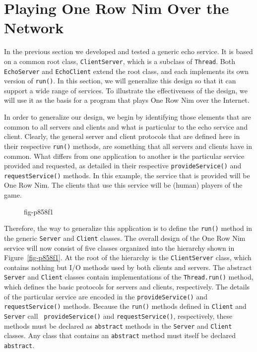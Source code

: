 \section{Playing One Row Nim Over the Network}

\noindent In the previous section we developed and tested a generic echo service.  
It is based on a common root class, {\tt ClientServer}, which is a subclass of
{\tt Thread}.  Both {\tt EchoServer} and {\tt EchoClient} extend the
root class, and each implements its own version of {\tt run()}. In
this section, we will generalize this design so that it can support a wide
range of services.  To illustrate the effectiveness of the design, we
will use it as the basis for a program that plays One Row Nim over the
Internet.

In order to generalize our design, we begin by identifying
those elements that are common to all
servers and clients and what is particular to the echo service and
client.  Clearly, the general server and client protocols that are defined
here in their respective {\tt run()} methods, are something that all
servers and clients have in common.  What differs from one application
to another is the particular service provided and requested, as
detailed in their respective {\tt provideService()} and {\tt
requestService()} methods. In this example, the service that is
provided will be One Row Nim.  The clients that use this service will
be (human) players of the game.

\begin{figure}[bt]
{fig-p858f1}
\end{figure}

Therefore, the way to generalize this application is to define the
{\tt run()} method in the generic {\tt Server} and {\tt Client}
classes. The overall design of the One Row Nim service will now consist of five classes
organized into the hierarchy shown in Figure~\ref{fig-p858f1}.  At
the root of the hierarchy is the {\tt ClientServer} class, which
contains nothing but I/O methods used by both clients and servers.
The abstract {\tt Server} and {\tt Client} classes contain
implementations of the {\tt Thread.run()} method, which defines the
basic protocols for servers and clients, respectively.   The details of the
particular service are encoded in the {\tt provideService()} and
{\tt requestService()} methods. Because the {\tt run()} methods defined 
in {\tt Client} and {\tt Server} call {\tt
provideService()} and {\tt requestService()}, respectively,  these
methods must be declared as {\tt abstract} methods in the {\tt Server}
and {\tt Client} classes.  Any class that contains an
\mbox{\tt abstract} method must itself be declared {\tt abstract}. 

